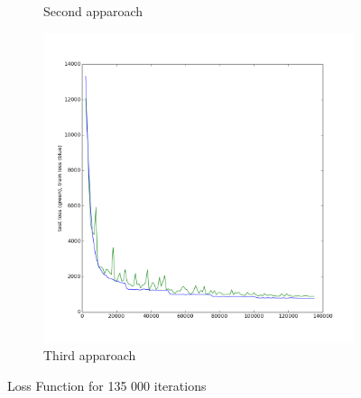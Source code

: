 \begin{figure}[ht]
\begin{subfigure}{0.33\textwidth}
\caption{Second apparoach}
\end{subfigure}%
\begin{subfigure}{0.33\textwidth}
\centering
\includegraphics[width=0.9\linewidth]{images/regression/test_loss_30_135000.png}
\caption{Third apparoach}
\end{subfigure}
\caption{Loss Function for 135 000 iterations}
\end{figure}

